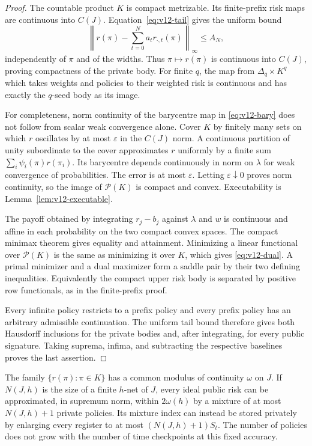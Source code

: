\begin{proof}
The countable product $K$ is compact metrizable. Its finite-prefix risk
maps are continuous into $C(J)$. Equation~\eqref{eq:v12-tail} gives the
uniform bound
\[
 \left\|r(\pi)-\sum_{t=0}^{N}a_t r_{\cdot,t}(\pi)\right\|_\infty
       \le A_N,
\]
independently of $\pi$ and of the widths. Thus $\pi\mapsto r(\pi)$ is
continuous into $C(J)$, proving compactness of the private body. For finite
$q$, the map from $\Delta_q\times K^q$ which takes weights and policies
to their weighted risk is continuous and has exactly the $q$-seed body
as its image.

For completeness, norm continuity of the barycentre map in
\eqref{eq:v12-bary} does not follow from scalar weak convergence alone.
Cover $K$ by finitely many sets on which $r$ oscillates by at most
$\varepsilon$ in the $C(J)$ norm. A continuous partition of unity
subordinate to the cover approximates $r$ uniformly by a finite sum
$\sum_i\psi_i(\pi)r(\pi_i)$. Its barycentre depends continuously in norm
on $\lambda$ for weak convergence of probabilities. The error is at most
$\varepsilon$. Letting $\varepsilon\downarrow0$ proves norm continuity,
so the image of $\mathcal P(K)$ is compact and convex. Executability is
Lemma~\ref{lem:v12-executable}.

The payoff obtained by integrating $r_j-b_j$ against $\lambda$ and $w$
is continuous and affine in each probability on the two compact convex
spaces. The compact minimax theorem gives equality and attainment.
Minimizing a linear functional over $\mathcal P(K)$ is the same as
minimizing it over $K$, which gives \eqref{eq:v12-dual}. A primal minimizer
and a dual maximizer form a saddle pair by their two defining inequalities.
Equivalently the compact upper risk body is separated by positive row
functionals, as in the finite-prefix proof.

Every infinite policy restricts to a prefix policy and every prefix
policy has an arbitrary admissible continuation. The uniform tail bound
therefore gives both Hausdorff inclusions for the private bodies and,
after integrating, for every public signature. Taking suprema, infima,
and subtracting the respective baselines proves the last assertion.
\end{proof}

\begin{corollary}
\label{cor:v12-seed}
The family $\{r(\pi):\pi\in K\}$ has a common modulus of continuity
$\omega$ on $J$. If $N(J,h)$ is the size of a finite $h$-net of $J$,
every ideal public risk can be approximated, in supremum norm, within
$2\omega(h)$ by a mixture of at most $N(J,h)+1$ private policies. Its
mixture index can instead be stored privately by enlarging every register
to at most $(N(J,h)+1)S_t$. The number of policies does not grow with the
number of time checkpoints at this fixed accuracy.
\end{corollary}

